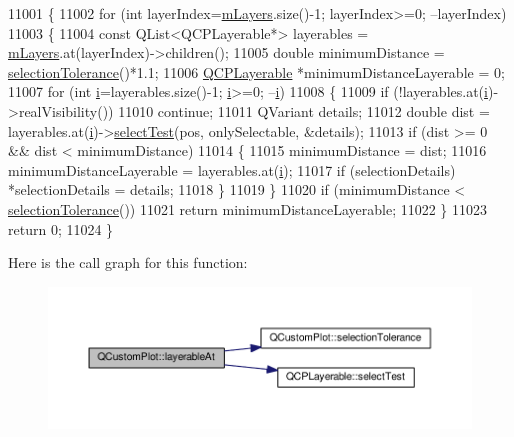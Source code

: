 \begin{DoxyCode}
11001 \{
11002   \textcolor{keywordflow}{for} (\textcolor{keywordtype}{int} layerIndex=\hyperlink{class_q_custom_plot_a72ee313041b873d76c198793ce7e6c37}{mLayers}.size()-1; layerIndex>=0; --layerIndex)
11003   \{
11004     \textcolor{keyword}{const} QList<QCPLayerable*> layerables = \hyperlink{class_q_custom_plot_a72ee313041b873d76c198793ce7e6c37}{mLayers}.at(layerIndex)->children();
11005     \textcolor{keywordtype}{double} minimumDistance = \hyperlink{class_q_custom_plot_a7b738074c75e80070ef6a10263c6cd69}{selectionTolerance}()*1.1;
11006     \hyperlink{class_q_c_p_layerable}{QCPLayerable} *minimumDistanceLayerable = 0;
11007     \textcolor{keywordflow}{for} (\textcolor{keywordtype}{int} \hyperlink{_comparision_pictures_2_createtest_image_8m_a6f6ccfcf58b31cb6412107d9d5281426}{i}=layerables.size()-1; \hyperlink{_comparision_pictures_2_createtest_image_8m_a6f6ccfcf58b31cb6412107d9d5281426}{i}>=0; --\hyperlink{_comparision_pictures_2_createtest_image_8m_a6f6ccfcf58b31cb6412107d9d5281426}{i})
11008     \{
11009       \textcolor{keywordflow}{if} (!layerables.at(\hyperlink{_comparision_pictures_2_createtest_image_8m_a6f6ccfcf58b31cb6412107d9d5281426}{i})->realVisibility())
11010         \textcolor{keywordflow}{continue};
11011       QVariant details;
11012       \textcolor{keywordtype}{double} dist = layerables.at(\hyperlink{_comparision_pictures_2_createtest_image_8m_a6f6ccfcf58b31cb6412107d9d5281426}{i})->\hyperlink{class_q_c_p_layerable_a4001c4d0dfec55598efa4d531f2179a9}{selectTest}(pos, onlySelectable, &details);
11013       \textcolor{keywordflow}{if} (dist >= 0 && dist < minimumDistance)
11014       \{
11015         minimumDistance = dist;
11016         minimumDistanceLayerable = layerables.at(\hyperlink{_comparision_pictures_2_createtest_image_8m_a6f6ccfcf58b31cb6412107d9d5281426}{i});
11017         \textcolor{keywordflow}{if} (selectionDetails) *selectionDetails = details;
11018       \}
11019     \}
11020     \textcolor{keywordflow}{if} (minimumDistance < \hyperlink{class_q_custom_plot_a7b738074c75e80070ef6a10263c6cd69}{selectionTolerance}())
11021       \textcolor{keywordflow}{return} minimumDistanceLayerable;
11022   \}
11023   \textcolor{keywordflow}{return} 0;
11024 \}
\end{DoxyCode}


Here is the call graph for this function\+:\nopagebreak
\begin{figure}[H]
\begin{center}
\leavevmode
\includegraphics[width=350pt]{class_q_custom_plot_a3fffd1d8364f657482ae985e0b5aa028_cgraph}
\end{center}
\end{figure}





